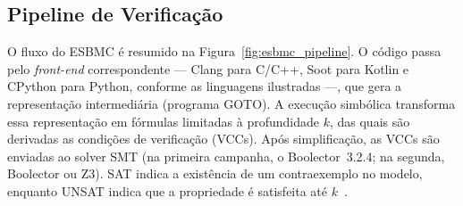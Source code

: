 \subsection{Pipeline de Verificação}

O fluxo do ESBMC é resumido na Figura~\ref{fig:esbmc_pipeline}. O código passa pelo \textit{front-end} correspondente --- Clang para C/C++, Soot para Kotlin e CPython para Python, conforme as linguagens ilustradas ---, que gera a representação intermediária (programa GOTO). A execução simbólica transforma essa representação em fórmulas limitadas à profundidade $k$, das quais são derivadas as condições de verificação (VCCs). Após simplificação, as VCCs são enviadas ao solver SMT (na primeira campanha, o Boolector~3.2.4; na segunda, Boolector ou Z3). SAT indica a existência de um contraexemplo no modelo, enquanto UNSAT indica que a propriedade é satisfeita até $k$~\cite{Cordeiro2012}.

